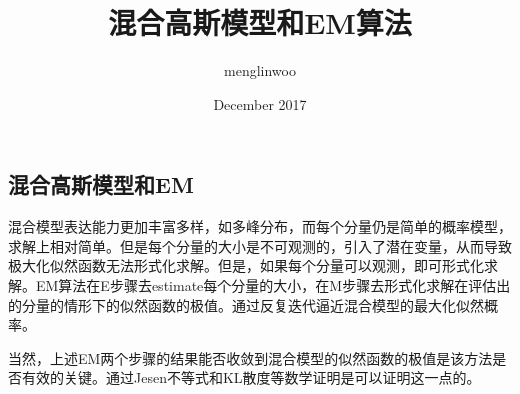 \documentclass{article}
\title{混合高斯模型和EM算法}
\author{menglinwoo }
\date{December 2017}
\begin{document}
\begin{CJK*}{UTF8}{gbsn}

\maketitle
\section{混合高斯模型和EM}
\par
混合模型表达能力更加丰富多样，如多峰分布，而每个分量仍是简单的概率模型，求解上相对简单。但是每个分量的大小是不可观测的，引入了潜在变量，从而导致极大化似然函数无法形式化求解。但是，如果每个分量可以观测，即可形式化求解。EM算法在E步骤去estimate每个分量的大小，在M步骤去形式化求解在评估出的分量的情形下的似然函数的极值。通过反复迭代逼近混合模型的最大化似然概率。\par
当然，上述EM两个步骤的结果能否收敛到混合模型的似然函数的极值是该方法是否有效的关键。通过Jesen不等式和KL散度等数学证明是可以证明这一点的。


\end{CJK*}
\end{document}
